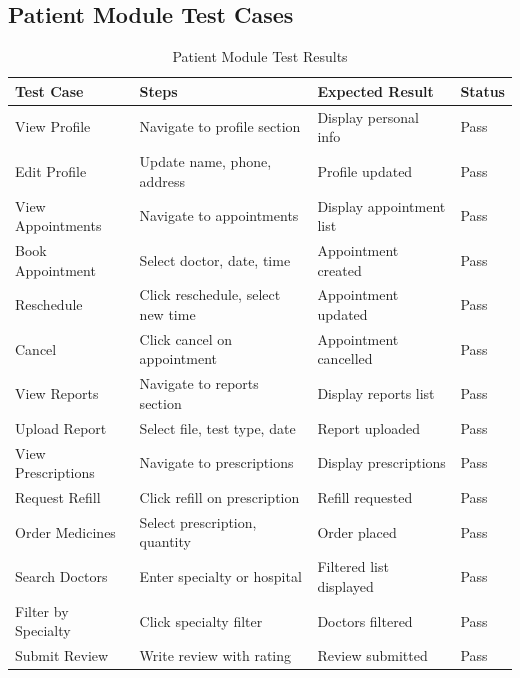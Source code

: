 \subsection{Patient Module Test Cases}

\begin{table}[H]
    \centering
    \small
    \vspace{-0.5\baselineskip}
    \setlength{\tabcolsep}{2pt}
    \begin{tabular}{|p{2.5cm}|p{3.8cm}|p{2.2cm}|p{1.2cm}|}
        \hline
        \textbf{Test Case} & \textbf{Steps} & \textbf{Expected Result} & \textbf{Status} \\
        \hline
        View Profile & Navigate to profile section & Display personal info & Pass \\
        \hline
        Edit Profile & Update name, phone, address & Profile updated & Pass \\
        \hline
        View Appointments & Navigate to appointments & Display appointment list & Pass \\
        \hline
        Book Appointment & Select doctor, date, time & Appointment created & Pass \\
        \hline
        Reschedule & Click reschedule, select new time & Appointment updated & Pass \\
        \hline
        Cancel & Click cancel on appointment & Appointment cancelled & Pass \\
        \hline
        View Reports & Navigate to reports section & Display reports list & Pass \\
        \hline
        Upload Report & Select file, test type, date & Report uploaded & Pass \\
        \hline
        View Prescriptions & Navigate to prescriptions & Display prescriptions & Pass \\
        \hline
        Request Refill & Click refill on prescription & Refill requested & Pass \\
        \hline
        Order Medicines & Select prescription, quantity & Order placed & Pass \\
        \hline
        Search Doctors & Enter specialty or hospital & Filtered list displayed & Pass \\
        \hline
        Filter by Specialty & Click specialty filter & Doctors filtered & Pass \\
        \hline
        Submit Review & Write review with rating & Review submitted & Pass \\
        \hline
    \end{tabular}
    \caption{Patient Module Test Results}
    \label{tab:patient-tests}
\end{table}

